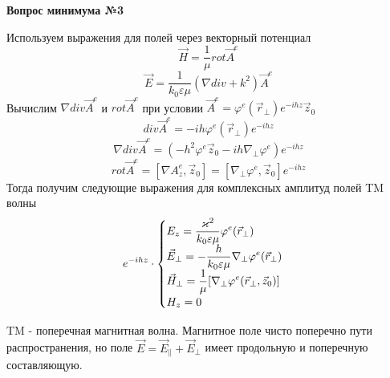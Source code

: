 \documentclass[a4paper,14pt]{extarticle}
\renewcommand{\phi}{\varphi}
\renewcommand{\epsilon}{\varepsilon}
\renewcommand{\kappa}{\varkappa}
\newcommand{\ticket}[1] {
\newpage
\hypertarget{num#1}{}
\begin{center}
	\textbf{Вопрос минимума №#1 }
\end{center}
}
\begin{document}
	\ticket{3}
	Используем выражения для полей через векторный потенциал
	$$\vec{H}=\frac{1}{\mu} rot\vec{A}^e $$
	$$\vec{E}=\frac{1}{k_0\epsilon\mu}(\nabla div + k^2)\vec{A}^e $$
	Вычислим $\nabla div \vec{A}^e$ и $rot \vec{A}^e$ при условии $\vec{A}^e = \phi^e(\vec{r}_\perp)e^{-ihz}\vec{z}_0$
	$$div \vec{A}^e = -ih\phi^e(\vec{r}_\perp)e^{-ihz}$$
	$$\nabla div \vec{A}^e = (-h^2\phi^e\vec{z}_0-ih\nabla_\perp\phi^e)e^{-ihz}$$
	$$rot \vec{A}^e = [\nabla A^e_z,\vec{z}_0] = [\nabla_\perp\phi^e,\vec{z}_0]e^{-ihz}$$
	Тогда получим следующие выражения для комплексных амплитуд полей TM волны 
	\begin{displaymath}
	e^{-ihz}\cdot
	\begin{cases}
	$$\displaystyle E_z = \frac{\kappa^2}{k_0\epsilon\mu}\phi^e(\vec{r}_\perp)$$ \\
	$$\displaystyle\vec{E}_\perp = -\frac{h}{k_0\epsilon\mu}\nabla_\perp\phi^e(\vec{r}_\perp)$$ \\
	$$\displaystyle\vec{H}_\perp = \frac{1}{\mu}[\nabla_\perp\phi^e(\vec{r}_\perp,\vec{z}_0)]$$ \\
	$$\displaystyle H_z = 0$$
	\end{cases}
	\end{displaymath}

	TM - поперечная магнитная волна. Магнитное поле чисто поперечно пути распространения, но поле $\vec{E}=\vec{E}_\parallel+\vec{E}_\perp$ имеет продольную и поперечную составляющую.
	
\end{document}
